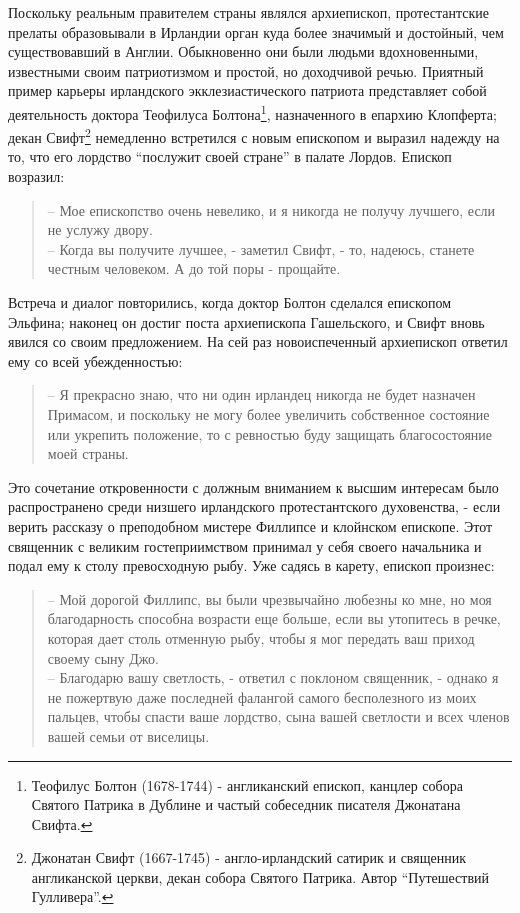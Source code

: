 \documentclass[
  oneside,
  12pt,
  titlepage]{book}
\begin{document}
Поскольку реальным правителем страны являлся архиепископ, протестантские прелаты образовывали в Ирландии орган куда более значимый и достойный, чем существовавший в Англии. Обыкновенно они были людьми вдохновенными, известными своим патриотизмом и простой, но доходчивой речью. Приятный пример карьеры ирландского экклезиастического патриота представляет собой деятельность доктора Теофилуса Болтона\footnote{Теофилус Болтон (1678-1744) - англиканский епископ, канцлер собора Святого Патрика в Дублине и частый собеседник писателя Джонатана Свифта.}, назначенного в епархию Клопферта; декан Свифт\footnote{Джонатан Свифт (1667-1745) - англо-ирландский сатирик и священник англиканской церкви, декан собора Святого Патрика. Автор ``Путешествий Гулливера''.} немедленно встретился с новым епископом и выразил надежду на то, что его лордство ``послужит своей стране'' в палате Лордов. Епископ возразил:

\begin{quote}
-- Мое епископство очень невелико, и я никогда не получу лучшего, если не услужу двору.\\
-- Когда вы получите лучшее, - заметил Свифт, - то, надеюсь, станете честным человеком. А до той поры - прощайте.
\end{quote}

Встреча и диалог повторились, когда доктор Болтон сделался епископом Эльфина; наконец он достиг поста архиепископа Гашельского, и Свифт вновь явился со своим предложением. На сей раз новоиспеченный архиепископ ответил ему со всей убежденностью:

\begin{quote}
-- Я прекрасно знаю, что ни один ирландец никогда не будет назначен Примасом, и поскольку не могу более увеличить собственное состояние или укрепить положение, то с ревностью буду защищать благосостояние моей страны.
\end{quote}

Это сочетание откровенности с должным вниманием к высшим интересам было распространено среди низшего ирландского протестантского духовенства, - если верить рассказу о преподобном мистере Филлипсе и клойнском епископе. Этот священник с великим гостеприимством принимал у себя своего начальника и подал ему к столу превосходную рыбу. Уже садясь в карету, епископ произнес:

\begin{quote}
-- Мой дорогой Филлипс, вы были чрезвычайно любезны ко мне, но моя благодарность способна возрасти еще больше, если вы утопитесь в речке, которая дает столь отменную рыбу, чтобы я мог передать ваш приход своему сыну Джо.\\
-- Благодарю вашу светлость, - ответил с поклоном священник, - однако я не пожертвую даже последней фалангой самого бесполезного из моих пальцев, чтобы спасти ваше лордство, сына вашей светлости и всех членов вашей семьи от виселицы.
\end{quote}
\end{document}
